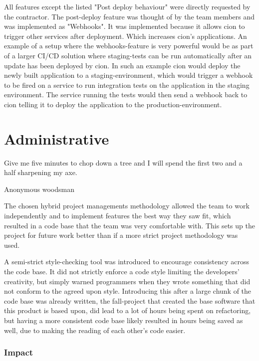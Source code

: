 All features except the listed "Post deploy behaviour" were directly requested by the contractor. The post-deploy feature was thought of by the team members and was implemented as "Webhooks". It was implemented because it allows cion to trigger other services after deployment. Which increases cion's applications.
An example of a setup where the webhooks-feature is very powerful would be as part of a larger CI/CD solution where staging-tests can be run automatically after an update has been deployed by cion. 
In such an example cion would deploy the newly built application to a staging-environment, which would trigger a webhook to be fired on a service to run integration tests on the application in the staging environment. The service running the tests would then send a webhook back to cion telling it to deploy the application to the production-environment.

\section{Administrative}
\epigraph{Give me five minutes to chop down a tree and I will spend the first two and a half sharpening my axe.}{Anonymous woodsman}
The chosen hybrid project managements methodology allowed the team to work independently and to implement features the best way they saw fit, which resulted in a code base that the team was very comfortable with. This sets up the project for future work better than if a more strict project methodology was used. 

A semi-strict style-checking tool was introduced to encourage consistency across the code base. It did not strictly enforce a code style limiting the developers' creativity, but simply warned programmers when they wrote something that did not conform to the agreed upon style. Introducing this after a large chunk of the code base was already written, the fall-project that created the base software that this product is based upon, did lead to a lot of hours being spent on refactoring, but having a more consistent code base likely resulted in hours being saved as well, due to making the reading of each other's code easier. 




\subsubsection{Impact}

